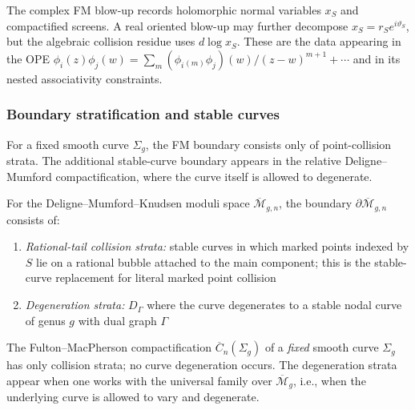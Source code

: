 \begin{remark}\label{rem:recording-collisions}
The complex FM blow-up records holomorphic normal variables $x_S$ and
compactified screens. A real oriented blow-up may further decompose
$x_S=r_Se^{i\vartheta_S}$, but the algebraic collision residue uses
$d\log x_S$. These are the data appearing in the OPE
$\phi_i(z)\phi_j(w)=\sum_m(\phi_i{}_{(m)}\phi_j)(w)/(z-w)^{m+1}
+\cdots$ and in its nested associativity constraints.
\end{remark}

\subsubsection{Boundary stratification and stable curves}

For a fixed smooth curve $\Sigma_g$, the FM boundary consists only of
point-collision strata. The additional stable-curve boundary appears in
the relative Deligne--Mumford compactification, where the curve itself
is allowed to degenerate.

\begin{theorem}\label{thm:boundary-higher-genus}
For the Deligne--Mumford--Knudsen moduli space
$\overline{\mathcal{M}}_{g,n}$, the boundary
$\partial\overline{\mathcal{M}}_{g,n}$ consists of:

\begin{enumerate}
\item \emph{Rational-tail collision strata:} stable curves in which
marked points indexed by $S$ lie on a rational bubble attached to the
main component; this is the stable-curve replacement for literal marked
point collision
\item \emph{Degeneration strata:} $D_{\Gamma}$ where the curve degenerates to a stable nodal curve of genus $g$ with dual graph $\Gamma$
\end{enumerate}

The Fulton--MacPherson compactification $\overline{C}_n(\Sigma_g)$ of a \emph{fixed} smooth curve $\Sigma_g$ has only collision strata; no curve degeneration occurs. The degeneration strata appear when one works with the universal family over $\overline{\mathcal{M}}_g$, i.e., when the underlying curve is allowed to vary and degenerate.
\end{theorem}

